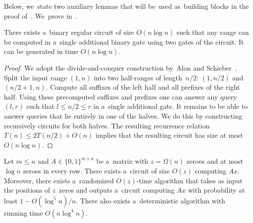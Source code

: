 Below, we~state two auxiliary lemmas that will
be~used as~building blocks in the proof
of~.
We~prove 
in~.

\begin{lemma}\label{lemma:decompose}
There exists a~binary regular circuit of size $O(n\log n)$ such that
any range can be computed in a~single additional binary gate
using two gates of the circuit. It can be generated in time
$O(n\log n)$.
\end{lemma}

\begin{proof}%
	We adopt the divide-and-conquer construction by~Alon and
	Schieber~\cite{Alon87optimalpreprocessing}. Split the input range $(1,n)$ into
	two half-ranges of length~$n/2$:
	$(1,n/2)$ and $(n/2+1,n)$.
	Compute all suffixes of the left half and all prefixes of
	the right half.
	Using these precomputed suffixes and
	prefixes one can answer any query $(l,r)$ such that $l \le n/2
	\le r$ in a~single additional gate. It remains to be able to answer
	queries that lie entirely in one of the halves. We do this by
	constructing recursively circuits for both halves. The resulting
	recurrence relation $T(n) \le 2T(n/2)+O(n)$ implies that the
	resulting circuit has size at most $O(n\log n)$.
\end{proof}



\begin{lemma}\label{lemma:permute}
Let $m \le n$ and $A \in \{0,1\}^{m \times n}$
be a~matrix with $z=\Omega(n)$ zeroes and at most $\log n$ zeroes in every row.
There exists a~circuit of size $O(z)$ computing $Ax$. Moreover, there exists
a~randomized $O(z)$-time %
algorithm that takes as input the positions of
$z$~zeros and outputs a~circuit computing $Ax$ with probability at least
$1-O(\log^5n)/n$. There also exists a~deterministic algorithm with
running time $O(n\log^4n)$.
\end{lemma}


